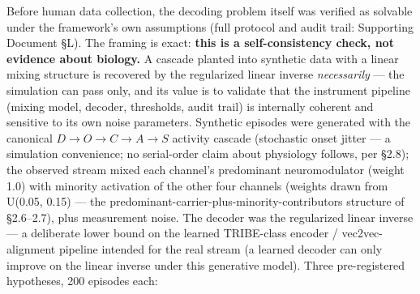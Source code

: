 \documentclass[11pt,twocolumn]{article}
\theoremstyle{plain}
\begin{document}
Before human data collection, the decoding problem itself was verified as solvable under the framework's own assumptions (full protocol and audit trail: Supporting Document \S{}L). The framing is exact: \textbf{this is a self-consistency check, not evidence about biology.} A cascade planted into synthetic data with a linear mixing structure is recovered by the regularized linear inverse \textit{necessarily} — the simulation can pass only, and its value is to validate that the instrument pipeline (mixing model, decoder, thresholds, audit trail) is internally coherent and sensitive to its own noise parameters. Synthetic episodes were generated with the canonical $D \to O \to C \to A \to S$ activity cascade (stochastic onset jitter — a simulation convenience; no serial-order claim about physiology follows, per \S{}2.8); the observed stream mixed each channel's predominant neuromodulator (weight 1.0) with minority activation of the other four channels (weights drawn from U(0.05, 0.15) — the predominant-carrier-plus-minority-contributors structure of \S{}2.6–2.7), plus measurement noise. The decoder was the regularized linear inverse — a deliberate lower bound on the learned TRIBE-class encoder / vec2vec-alignment pipeline intended for the real stream (a learned decoder can only improve on the linear inverse under this generative model). Three pre-registered hypotheses, 200 episodes each:
\end{document}
